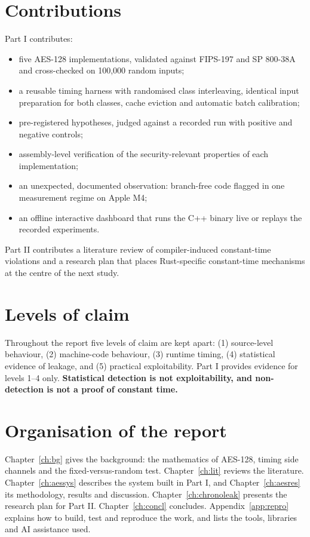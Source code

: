 \section{Contributions}

Part I contributes:
\begin{itemize}
  \item five AES-128 implementations, validated against FIPS-197 and SP 800-38A and cross-checked on 100,000 random inputs;
  \item a reusable timing harness with randomised class interleaving, identical input preparation for both classes, cache eviction and automatic batch calibration;
  \item pre-registered hypotheses, judged against a recorded run with positive and negative controls;
  \item assembly-level verification of the security-relevant properties of each implementation;
  \item an unexpected, documented observation: branch-free code flagged in one measurement regime on Apple M4;
  \item an offline interactive dashboard that runs the C++ binary live or replays the recorded experiments.
\end{itemize}

Part II contributes a literature review of compiler-induced constant-time violations and a research plan that places Rust-specific constant-time mechanisms at the centre of the next study.

\section{Levels of claim}

Throughout the report five levels of claim are kept apart:
(1) source-level behaviour, (2) machine-code behaviour, (3) runtime timing, (4) statistical evidence of leakage, and (5) practical exploitability. Part I provides evidence for levels 1--4 only. \textbf{Statistical detection is not exploitability, and non-detection is not a proof of constant time.}

\section{Organisation of the report}

Chapter~\ref{ch:bg} gives the background: the mathematics of AES-128, timing side channels and the fixed-versus-random test. Chapter~\ref{ch:lit} reviews the literature. Chapter~\ref{ch:aessys} describes the system built in Part I, and Chapter~\ref{ch:aesres} its methodology, results and discussion. Chapter~\ref{ch:chronoleak} presents the research plan for Part II. Chapter~\ref{ch:concl} concludes. Appendix~\ref{app:repro} explains how to build, test and reproduce the work, and lists the tools, libraries and AI assistance used.
